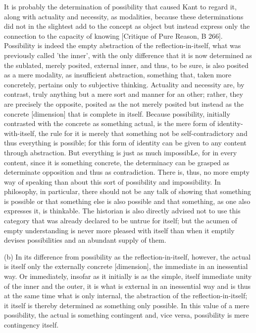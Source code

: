 It is probably the determination of possibility that caused
Kant to regard it, along with actuality and necessity, as modalities,
because these determinations did not in the slightest add to the concept
as object but instead express only the connection to the
capacity of knowing [Critique of Pure Reason, B 266].
Possibility is indeed the empty abstraction of the reflection-in-itself,
what was previously called 'the inner', with the only difference that
it is now determined as the sublated, merely posited, external inner,
and thus, to be sure, is also posited as a mere modality,
as insufficient abstraction, something that, taken more concretely,
pertains only to subjective thinking.
Actuality and necessity are, by contrast, truly
anything but a mere sort and manner for an other; rather, they are
precisely the opposite, posited as the not merely posited but instead
as the concrete [dimension] that is complete in itself.
Because possibility, initially contrasted with
the concrete as something actual,
is the mere form of identity-with-itself,
the rule for it is merely that something not be self-contradictory and
thus everything is possible;
for this form of identity can be given to any content through abstraction.
But everything is just as much impossibLe, for in
every content, since it is something concrete, the determinacy can
be grasped as determinate opposition and thus as contradiction.
There is, thus, no more empty way of speaking than about this sort
of possibility and impossibility.
In philosophy, in particular, there should not be any talk of showing that
something is possible or that something else is also possible and
that something, as one also expresses it, is thinkable.
The historian is also directly advised not to use this
category that was already declared to be untrue for itself;
but the acumen of empty understanding is never more pleased with itself
than when it emptily devises possibilities and an abundant supply of them.

(b) In its difference from possibility as the reflection-in-itself, however,
the actual is itself only the externally concrete [dimension],
the immediate in an inessential way.
Or immediately, insofar as it initially is as the simple,
itself immediate unity of the inner and the outer,
it is what is external in an inessential way and
is thus at the same time what is only internal,
the abstraction of the reflection-in-itself;
it itself is thereby determined as something only possible.
In this value of a mere possibility, the actual is something contingent and,
vice versa, possibility is mere contingency itself.

